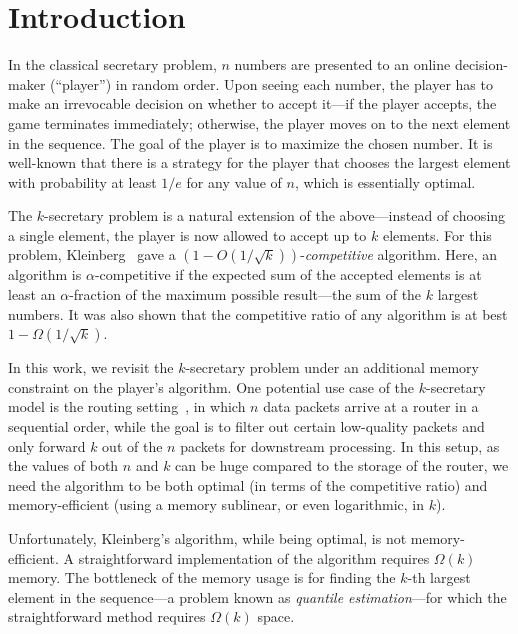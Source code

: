 \section{Introduction}
In the classical secretary problem, $n$ numbers are presented to an online decision-maker (``player'') in random order. Upon seeing each number, the player has to make an irrevocable decision on whether to accept it---if the player accepts, the game terminates immediately; otherwise, the player moves on to the next element in the sequence. The goal of the player is to maximize the chosen number. It is well-known that there is a strategy for the player that chooses the largest element with probability at least $1/e$ for any value of $n$, which is essentially optimal.

The $k$-secretary problem is a natural extension of the above---instead of choosing a single element, the player is now allowed to accept up to $k$ elements. For this problem, Kleinberg~\cite{Kleinberg05} gave a $(1 - O(1/\sqrt{k}))$-\emph{competitive} algorithm. Here, an algorithm is $\alpha$-competitive if the expected sum of the accepted elements is at least an $\alpha$-fraction of the maximum possible result---the sum of the $k$ largest numbers. It was also shown that the competitive ratio of any algorithm is at best $1 - \Omega(1/\sqrt{k})$.

In this work, we revisit the $k$-secretary problem under an additional memory constraint on the player's algorithm. One potential use case of the $k$-secretary model is the routing setting~\cite{nakano2011message}, in which $n$ data packets arrive at a router in a sequential order, while the goal is to filter out certain low-quality packets and only forward $k$ out of the $n$ packets for downstream processing. In this setup, as the values of both $n$ and $k$ can be huge compared to the storage of the router, we need the algorithm to be both optimal (in terms of the competitive ratio) and memory-efficient (using a memory sublinear, or even logarithmic, in $k$).

Unfortunately, Kleinberg's algorithm, while being optimal, is not memory-efficient. A straightforward implementation of the algorithm requires $\Omega(k)$ memory. The bottleneck of the memory usage is for finding the $k$-th largest element in the sequence---a problem known as \emph{quantile estimation}---for which the straightforward method requires $\Omega(k)$ space.

